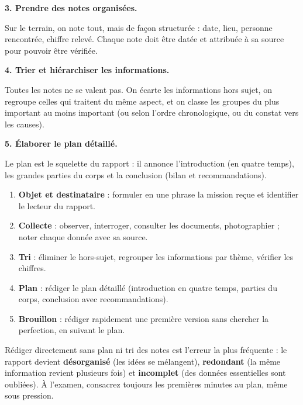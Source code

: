 \documentclass[11pt]{article}
\begin{document}
\textbf{3. Prendre des notes organisées.}\par
Sur le terrain, on note tout, mais de façon structurée : date, lieu, personne rencontrée, chiffre relevé. Chaque note doit être datée et attribuée à sa source pour pouvoir être vérifiée.

\textbf{4. Trier et hiérarchiser les informations.}\par
Toutes les notes ne se valent pas. On écarte les informations hors sujet, on regroupe celles qui traitent du même aspect, et on classe les groupes du plus important au moins important (ou selon l'ordre chronologique, ou du constat vers les causes).

\textbf{5. Élaborer le plan détaillé.}\par
Le plan est le squelette du rapport : il annonce l'introduction (en quatre temps), les grandes parties du corps et la conclusion (bilan et recommandations).

\begin{methode}
\begin{enumerate}
\item \textbf{Objet et destinataire} : formuler en une phrase la mission reçue et identifier le lecteur du rapport.
\item \textbf{Collecte} : observer, interroger, consulter les documents, photographier ; noter chaque donnée avec sa source.
\item \textbf{Tri} : éliminer le hors-sujet, regrouper les informations par thème, vérifier les chiffres.
\item \textbf{Plan} : rédiger le plan détaillé (introduction en quatre temps, parties du corps, conclusion avec recommandations).
\item \textbf{Brouillon} : rédiger rapidement une première version sans chercher la perfection, en suivant le plan.
\end{enumerate}
\end{methode}

\begin{attention}
Rédiger directement sans plan ni tri des notes est l'erreur la plus fréquente : le rapport devient \textbf{désorganisé} (les idées se mélangent), \textbf{redondant} (la même information revient plusieurs fois) et \textbf{incomplet} (des données essentielles sont oubliées). À l'examen, consacrez toujours les premières minutes au plan, même sous pression.
\end{attention}
\end{document}
